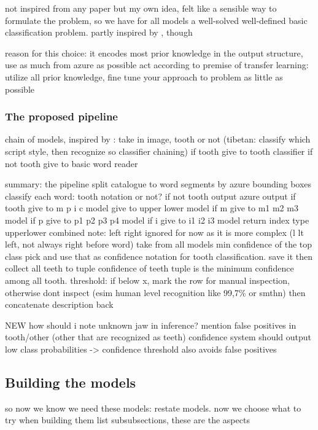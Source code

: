 \documentclass{article}
\begin{document}
not inspired from any paper but my own idea, felt like a sensible way to formulate the problem, 
so we have for all models a well-solved well-defined basic classification problem. partly inspired by \cite{tibetan_ocr}, though

reason for this choice: it encodes most prior knowledge in the output structure, use as much from azure as possible
    act according to premise of transfer learning: utilize all prior knowledge, fine tune your approach to problem as little as possible

\subsubsection{The proposed pipeline}

chain of models, inspired by \cite{tibetan_ocr}: take in image, tooth or not
    (tibetan: classify which script style, then recognize so classifier chaining)
    if tooth give to tooth classifier 
    if not tooth give to basic word reader

summary: the pipeline
split catalogue to word segments by azure bounding boxes 
classify each word: tooth notation or not?
if not tooth output azure output
if tooth   
    give to m p i c model
    give to upper lower model 
    if m
        give to m1 m2 m3 model
    if p
        give to p1 p2 p3 p4 model
    if i
        give to i1 i2 i3 model
    return index type upperlower combined
    note: left right ignored for now as it is more complex (l lt left, not always right before word)
    take from all models min confidence of the top class pick and use that as confidence notation for 
    tooth classification. save it
then collect all teeth to tuple 
    confidence of teeth tuple is the minimum confidence among all tooth.
    threshold: if below x, mark the row for manual inspection, otherwise dont inspect (esim human level recognition like 99,7\% or smthn)
then concatenate description back       

NEW
how should i note unknown jaw in inference?
mention false positives in tooth/other (other that are recognized as teeth)
    confidence system should output low class probabilities -> confidence 
    threshold also avoids false positives

\subsection{Building the models}

so now we know we need these models: restate models. now we choose what to try when building them
list subsubsections, these are the aspects
\end{document}
